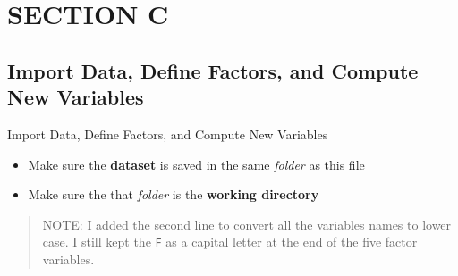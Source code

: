 \documentclass[
]{article}
\providecommand{\tightlist}{%
  \setlength{\itemsep}{0pt}\setlength{\parskip}{0pt}}
\begin{document}
\clearpage

\hypertarget{section-c}{%
\section{SECTION C}\label{section-c}}

\hypertarget{import-data-define-factors-and-compute-new-variables}{%
\subsection{Import Data, Define Factors, and Compute New
Variables}\label{import-data-define-factors-and-compute-new-variables}}

Import Data, Define Factors, and Compute New Variables

\begin{itemize}
\tightlist
\item
  Make sure the \textbf{dataset} is saved in the same \emph{folder} as
  this file
\item
  Make sure the that \emph{folder} is the \textbf{working directory}
\end{itemize}

\begin{quote}
NOTE: I added the second line to convert all the variables names to
lower case. I still kept the \texttt{F} as a capital letter at the end
of the five factor variables.
\end{quote}
\end{document}

